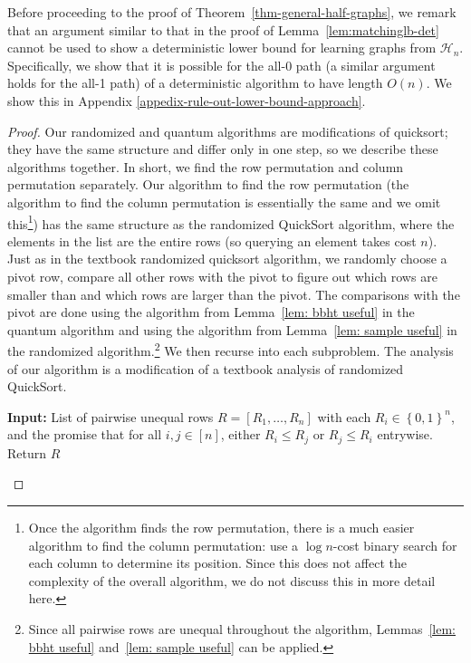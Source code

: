 \documentclass[11pt]{article}
\newcommand{\cH}{\mathcal{H}}
\newcommand{\set}[1]{\left\{ #1 \right\}}
\newcommand{\zone}{\set{0,1}}
\begin{document}
Before proceeding to the proof of Theorem~\ref{thm-general-half-graphs}, we remark that  
an argument similar to that in the proof of Lemma~\ref{lem:matchinglb-det} cannot be used to show a deterministic lower bound for learning graphs from $\cH_n$. Specifically, we show that it is possible for the all-0 path (a similar argument holds for the all-1 path) of a deterministic algorithm to have length $O(n)$. We show this in Appendix \ref{appedix-rule-out-lower-bound-approach}.

\mainResultGeneralHalfGraphs*

\begin{proof}    
    Our randomized and quantum algorithms are modifications of quicksort; they have the same structure and differ only in one step, so we describe these algorithms together. In short, we find the row permutation and column permutation separately. Our algorithm to find the row permutation (the algorithm to find the column permutation is essentially the same and we omit this\footnote{Once the algorithm finds the row permutation, there is a much easier algorithm to find the column permutation: use a $\log n$-cost binary search for each column to determine its position. Since this does not affect the complexity of the overall algorithm, we do not discuss this in more detail here.}) has the same structure as the randomized QuickSort algorithm, where the elements in the list are the entire rows (so querying an element takes cost $n$). Just as in the textbook randomized quicksort algorithm, we randomly choose a pivot row, compare all other rows with the pivot to figure out which rows are smaller than and which rows are larger than the pivot. The comparisons with the pivot are done using the algorithm from Lemma~\ref{lem: bbht useful} in the quantum algorithm and using the algorithm from Lemma~\ref{lem: sample useful} in the randomized algorithm.\footnote{Since all pairwise rows are unequal throughout the algorithm, Lemmas~\ref{lem: bbht useful} and~\ref{lem: sample useful} can be applied.} We then recurse into each subproblem. The analysis of our algorithm is a modification of a textbook analysis of randomized QuickSort.
        \begin{algorithm}[h]
        \begin{algorithmic}[1]
            \State \textbf{Input:} List of pairwise unequal rows $R = [R_1, \dots, R_n]$ with each $R_i \in \zone^n$, and the promise that for all $i, j \in [n]$, either $R_i \leq R_j$ or $R_j \leq R_i$ entrywise.
                \State Return $R$

\end{algorithmic}
\end{algorithm}
\end{proof}
\end{document}
